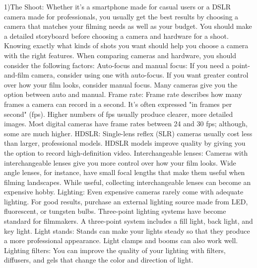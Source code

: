 1)The Shoot:
Whether it's a smartphone made for casual users or a DSLR camera made for professionals, you usually get the best results by choosing a camera that matches your filming needs as well as your budget.
You should make a detailed storyboard before choosing a camera and hardware for a shoot. Knowing exactly what kinds of shots you want should help you choose a camera with the right features. When comparing cameras and hardware, you should consider the following factors:
Auto-focus and manual focus: If you need a point-and-film camera, consider using one with auto-focus. If you want greater control over how your film looks, consider manual focus. Many cameras give you the option between auto and manual.
Frame rate: Frame rate describes how many frames a camera can record in a second. It's often expressed "in frames per second" (fps). Higher numbers of fps usually produce clearer, more detailed images. Most digital cameras have frame rates between 24 and 30 fps; although, some are much higher.
HDSLR: Single-lens reflex (SLR) cameras usually cost less than larger, professional models. HDSLR models improve quality by giving you the option to record high-definition video.
Interchangeable lenses: Cameras with interchangeable lenses give you more control over how your film looks. Wide angle lenses, for instance, have small focal lengths that make them useful when filming landscapes. While useful, collecting interchangeable lenses can become an expensive hobby.
Lighting: Even expensive cameras rarely come with adequate lighting. For good results, purchase an external lighting source made from LED, fluorescent, or tungsten bulbs. Three-point lighting systems have become standard for filmmakers. A three-point system includes a fill light, back light, and key light.
Light stands: Stands can make your lights steady so that they produce a more professional appearance. Light clamps and booms can also work well.
Lighting filters: You can improve the quality of your lighting with filters, diffusers, and gels that change the color and direction of light.


